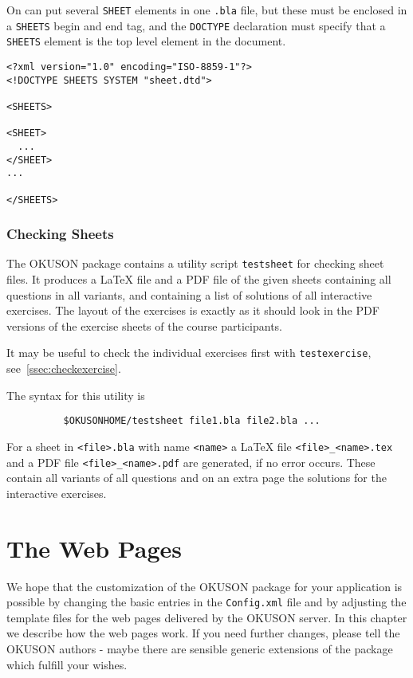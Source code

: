 \documentclass[12pt,openany,a4paper]{book}
\newcommand{\OKUSON}{\textsf{OKUSON}}
\begin{document}
On can put several \texttt{SHEET} elements in one \texttt{.bla} file, but
these must be enclosed in a \texttt{SHEETS} begin and end tag, and the
\texttt{DOCTYPE} declaration must specify that a \texttt{SHEETS}
element is the top level element in the document.

\begin{verbatim}
<?xml version="1.0" encoding="ISO-8859-1"?>
<!DOCTYPE SHEETS SYSTEM "sheet.dtd">

<SHEETS>

<SHEET>
  ...
</SHEET>
...

</SHEETS>
\end{verbatim}


\subsection*{Checking Sheets}\label{ssec:checksheet}

The {\OKUSON} package contains a utility script \texttt{testsheet} 
for checking  sheet files.
It produces a {\LaTeX} file and a PDF file of the given sheets containing all
questions in all variants, and containing a list of solutions of all
interactive exercises. The layout of the exercises is exactly as it should
look in the PDF versions of the exercise sheets of the course participants.

It may be useful to check the individual exercises first with
\texttt{testexercise}, see~\ref{ssec:checkexercise}.

The syntax for this utility is

\verb+          $OKUSONHOME/testsheet file1.bla file2.bla ...+

For a sheet in \texttt{<file>.bla} with name \texttt{<name>} a {\LaTeX} 
file \verb+<file>_<name>.tex+ and a PDF file \verb+<file>_<name>.pdf+ 
are generated, if no error occurs.
These contain all variants of all questions and on an extra page the
solutions for the interactive exercises.




\chapter{The Web Pages}\label{ch:webpages}

We hope that the customization of the {\OKUSON} package for your 
application is possible by changing the basic entries in the
\texttt{Config.xml} file and by adjusting the template files for the web
pages delivered by the {\OKUSON} server. In this chapter we describe how the
web pages work. If you need further changes, please tell the {\OKUSON}
authors - maybe there are sensible generic extensions of the package which
fulfill your wishes.
\end{document}
